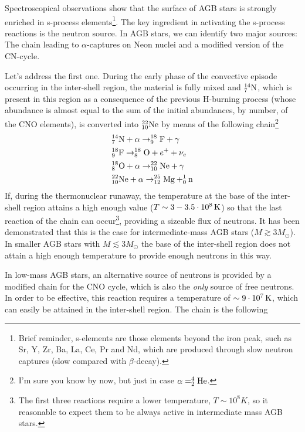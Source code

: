 Spectroscopical observations show that the surface of AGB stars is strongly enriched in s-process elements\footnote{Brief reminder, s-elements are those elements beyond the iron peak, such as Sr, Y, Zr, Ba, La, Ce, Pr and Nd, which are produced through slow neutron captures (slow compared with $\beta$-decay).}. The key ingredient in activating the s-process reactions is the neutron source. In AGB stars, we can identify two major sources: The chain leading to $\alpha$-captures on Neon nuclei and a modified version of the CN-cycle.
\par Let's address the first one. During the early phase of the convective episode occurring in the inter-shell region, the material is fully mixed and $\element{N}{14}{7}$, which is present in this region as a consequence of the previous H-burning process (whose abundance is almost equal to the sum of the initial abundances, by number, of the CNO elements), is converted into $\element{Ne}{22}{10}$ by means of the following chain\footnote{I'm sure you know by now, but just in case $\alpha = \element{He}{4}{2}$.} 
\begin{align*}
    & \element{N}{14}{7}+\alpha \to \element{F}{18}{9}+\gamma\\
    & \element{F}{18}{9} \to \element{O}{18}{8}+e^{+}+\nu_{e}\\
    & \element{O}{18}{8}+\alpha \to \element{Ne}{22}{10}+\gamma \\
    & \element{Ne}{22}{10}+\alpha \to \element{Mg}{25}{12}+\element{n}{1}{0}
\end{align*}
If, during the thermonuclear runaway, the temperature at the base of the inter-shell region attains a high enough value ($T\sim 3-3.5\power{10}{8}\unit{K}$) so that the last reaction of the chain can occur\footnote{The first three reactions require a lower temperature, $T\sim 10^{8}\unit{K}$, so it reasonable to expect them to be always active in intermediate mass AGB stars.}, providing a sizeable flux of neutrons. It has been demonstrated that this is the case for intermediate-mass AGB stars ($M\gtrsim 3M_{\odot}$). In smaller AGB stars with $M \lesssim 3M_{\odot}$ the base of the inter-shell region does not attain a high enough temperature to provide enough neutrons in this way.
\par In low-mass AGB stars, an alternative source of neutrons is provided by a modified chain for the CNO cycle, which is also the \emph{only} source of free neutrons. In order to be effective, this reaction requires a temperature of $\sim 9\power{10}{7}\unit{K}$, which can easily be attained in the inter-shell region. The chain is the following
